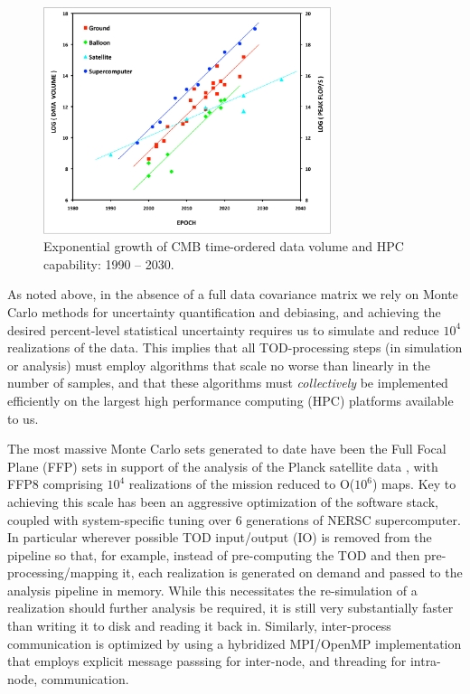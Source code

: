 \begin{figure}[htbp]
\centering
\includegraphics[width=0.75\textwidth]{Analysis/cmb_hpc_scaling}
\caption{Exponential growth of CMB time-ordered data volume and HPC capability: 1990 -- 2030.}
\label{fig_cmb_hpc_scaling}
\end{figure}

As noted above, in the absence of a full data covariance matrix we rely on Monte Carlo methods for uncertainty quantification and debiasing, and achieving the desired percent-level statistical uncertainty requires us to simulate and reduce $10^4$ realizations of the data. This implies that all TOD-processing steps (in simulation or analysis) must employ algorithms that scale no worse than linearly in the number of samples, and that these algorithms must {\em collectively} be implemented efficiently on the largest high performance computing (HPC) platforms available to us. 

The most massive Monte Carlo sets generated to date have been the Full Focal Plane (FFP) sets in support of the analysis of the Planck satellite data \cite{Ade:2015via}, with FFP8 comprising $10^4$ realizations of the mission reduced to O($10^6$) maps. Key to achieving this scale has been an aggressive optimization of the software stack, coupled with system-specific tuning over 6 generations of NERSC supercomputer. In particular wherever possible TOD input/output (IO) is removed from the pipeline so that, for example, instead of pre-computing the TOD and then pre-processing/mapping it, each realization is generated on demand and passed to the analysis pipeline in memory. While this necessitates the re-simulation of a realization should further analysis be required, it is still very substantially faster than writing it to disk and reading it back in. Similarly, inter-process communication is optimized by using a hybridized MPI/OpenMP implementation that employs explicit message passsing for inter-node, and threading for intra-node, communication.

